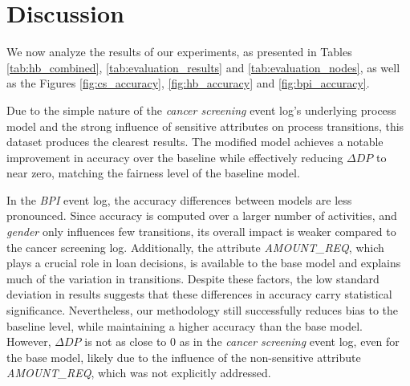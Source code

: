 
\section{Discussion}
We now analyze the results of our experiments, as presented in Tables \ref{tab:hb_combined}, \ref{tab:evaluation_results} and \ref{tab:evaluation_nodes},
as well as the Figures \ref{fig:cs_accuracy}, \ref{fig:hb_accuracy} and \ref{fig:bpi_accuracy}.

Due to the simple nature of the \textit{cancer screening} event log's underlying process model
and the strong influence of sensitive attributes on process transitions,
this dataset produces the clearest results.
The modified model achieves a notable improvement in accuracy over the baseline while effectively reducing $\Delta \textit{DP}$ to near zero,
matching the fairness level of the baseline model.

In the \textit{BPI} event log, the accuracy differences between models are less pronounced.
Since accuracy is computed over a larger number of activities, and \textit{gender} only influences few transitions,
its overall impact is weaker compared to the cancer screening log.
Additionally, the attribute \textit{AMOUNT\_REQ}, which plays a crucial role in loan decisions,
is available to the base model and explains much of the variation in transitions.
Despite these factors, the low standard deviation in results suggests that these differences in accuracy carry statistical significance.
Nevertheless, our methodology still successfully reduces bias to the baseline level, while maintaining a higher accuracy than the base model.
However, $\Delta \textit{DP}$ is not as close to 0 as in the \textit{cancer screening} event log,
even for the base model, likely due to the influence of the non-sensitive attribute \textit{AMOUNT\_REQ}, which was not explicitly addressed.


